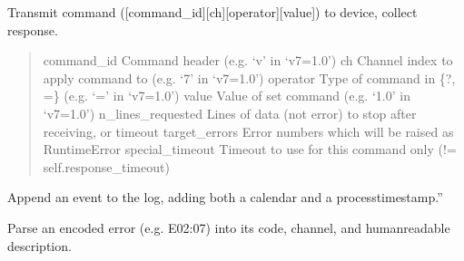 \documentclass[letterpaper,10pt,english]{sphinxmanual}
\begin{document}
\begin{fulllineitems}
\begin{fulllineitems}
\label{\detokenize{qontrol:qontrol.Qontroller.issue_command}}
Transmit command ({[}command\_id{]}{[}ch{]}{[}operator{]}{[}value{]}) to device, collect response.
\begin{quote}

command\_id                      Command header (e.g. ‘v’ in ‘v7=1.0’)
ch                                      Channel index to apply command to (e.g. ‘7’ in ‘v7=1.0’)
operator                        Type of command in \{?, =\} (e.g. ‘=’ in ‘v7=1.0’)
value                           Value of set command (e.g. ‘1.0’ in ‘v7=1.0’)
n\_lines\_requested       Lines of data (not error) to stop after receiving, or timeout
target\_errors           Error numbers which will be raised as RuntimeError
special\_timeout         Timeout to use for this command only (!= self.response\_timeout)
\end{quote}

\end{fulllineitems}


\begin{fulllineitems}
\label{\detokenize{qontrol:qontrol.Qontroller.log_append}}
Append an event to the log, adding both a calendar\sphinxhyphen{} and a process\sphinxhyphen{}timestamp.”

\end{fulllineitems}


\begin{fulllineitems}
\label{\detokenize{qontrol:qontrol.Qontroller.parse_error}}
Parse an encoded error (e.g. E02:07) into its code, channel, and human\sphinxhyphen{}readable description.


\end{fulllineitems}
\end{fulllineitems}
\end{document}
